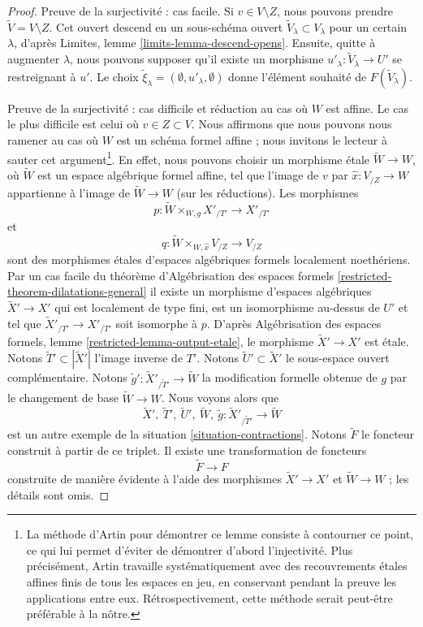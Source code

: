 \begin{proof}
\medskip\noindent
Preuve de la surjectivité : cas facile.
Si $v \in V \setminus Z$, nous pouvons prendre $\tilde V = V \setminus Z$.
Cet ouvert descend en un sous-schéma ouvert
$\tilde V_\lambda \subset V_\lambda$ pour un certain $\lambda$, d'après
Limites, lemme \ref{limits-lemma-descend-opens}. Ensuite, quitte à augmenter
$\lambda$, nous pouvons supposer qu'il existe un morphisme
$u'_\lambda : \tilde V_\lambda \to U'$ se restreignant à $u'$. Le choix
$\tilde \xi_\lambda = (\emptyset, u'_\lambda, \emptyset)$
donne l'élément souhaité de $F(\tilde V_\lambda)$.

\medskip\noindent
Preuve de la surjectivité : cas difficile et réduction au cas où $W$ est affine.
Le cas le plus difficile est celui où $v \in Z \subset V$.
Nous affirmons que nous pouvons nous ramener au cas où $W$ est un
schéma formel affine ; nous invitons le lecteur à sauter cet argument\footnote{La
méthode d'Artin pour démontrer ce lemme consiste à contourner ce point, ce qui
lui permet d'éviter de démontrer d'abord l'injectivité. Plus précisément, Artin
travaille systématiquement avec des recouvrements \'etales affines finis de tous
les espaces en jeu, en conservant pendant la preuve les applications entre eux.
Rétrospectivement, cette méthode serait peut-être préférable à la nôtre.}.
En effet, nous pouvons choisir un morphisme \'etale
$\tilde W \to W$, où $\tilde W$ est un espace algébrique formel affine,
tel que l'image de $v$ par $\hat x : V_{/Z} \to W$ appartienne
à l'image de $\tilde W \to W$ (sur les réductions).
Les morphismes
$$
p : \tilde W \times_{W, g} X'_{/T'} \longrightarrow X'_{/T'}
$$
et
$$
q : \tilde W \times_{W, \hat x} V_{/Z} \to V_{/Z}
$$
sont des morphismes \'etales d'espaces algébriques formels localement
noethériens. Par un cas facile du théorème d'Algébrisation des espaces formels
\ref{restricted-theorem-dilatations-general}
il existe un morphisme d'espaces algébriques $\tilde X' \to X'$
qui est localement de type fini, est un isomorphisme au-dessus de $U'$ et
tel que $\tilde X'_{/T'} \to X'_{/T'}$ soit isomorphe à $p$.
D'après Algébrisation des espaces formels, lemme
\ref{restricted-lemma-output-etale}, le morphisme $\tilde X' \to X'$ est
\'etale. Notons $\tilde T' \subset |\tilde X'|$ l'image inverse de $T'$.
Notons $\tilde U' \subset \tilde X'$ le sous-espace ouvert complémentaire.
Notons $\tilde g' : \tilde X'_{/\tilde T'} \to \tilde W$
la modification formelle obtenue de $g$ par le changement de base
$\tilde W \to W$. Nous voyons alors que
$$
\tilde X',\ \tilde T',\ \tilde U',\ \tilde W,
\ \tilde g : \tilde X'_{/\tilde T'} \to \tilde W
$$
est un autre exemple de la situation \ref{situation-contractions}.
Notons $\tilde F$ le foncteur construit à partir de ce triplet.
Il existe une transformation de foncteurs
$$
\tilde F \longrightarrow F
$$
construite de manière évidente à l'aide des morphismes $\tilde X' \to X'$ et
$\tilde W \to W$ ; les détails sont omis.


\end{proof}
